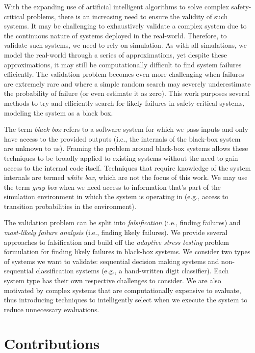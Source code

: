 With the expanding use of artificial intelligent algorithms to solve complex safety-critical problems, there is an increasing need to ensure the validity of such systems.
It may be challenging to exhaustively validate a complex system due to the continuous nature of systems deployed in the real-world.
Therefore, to validate such systems, we need to rely on simulation.
As with all simulations, we model the real-world through a series of approximations, yet despite these approximations, it may still be computationally difficult to find system failures efficiently.
The validation problem becomes even more challenging when failures are extremely rare and where a simple random search may severely underestimate the probability of failure (or even estimate it as zero).
This work purposes several methods to try and efficiently search for likely failures in safety-critical systems, modeling the system as a black box.


The term \textit{black box} refers to a software system for which we pass inputs and only have access to the provided outputs (i.e., the internals of the black-box system are unknown to us).
Framing the problem around black-box systems allows these techniques to be broadly applied to existing systems without the need to gain access to the internal code itself. 
Techniques that require knowledge of the system internals are termed \textit{white box}, which are not the focus of this work. 
We may use the term \textit{gray box} when we need access to information that's part of the simulation environment in which the system is operating in (e.g., access to transition probabilities in the environment).

The validation problem can be split into \textit{falsification} (i.e., finding failures) and \textit{most-likely failure analysis} (i.e., finding likely failures). 
We provide several approaches to falsification and build off the \textit{adaptive stress testing} \cite{lee2020adaptive} problem formulation for finding likely failures in black-box systems.
We consider two types of systems we want to validate: sequential decision making systems and non-sequential classification systems (e.g., a hand-written digit classifier).
Each system type has their own respective challenges to consider.
We are also motivated by complex systems that are computationally expensive to evaluate, thus introducing techniques to intelligently select when we execute the system to reduce unnecessary evaluations. 



\section{Contributions}\label{sec:contributions}

